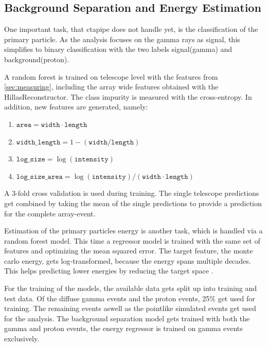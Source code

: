 \subsection{Background Separation and Energy Estimation}
One important task, that ctapipe does not handle yet, is the classification of
the primary particle. As the analysis focuses on the gamma rays as signal, 
this simplifies to binary classification with the two labels signal(gamma) and
background(proton).

A random forest is trained
on telescope level with the features from \ref{sec:measuring}, including
the array wide features obtained with the
HillasReconstructor.
The class impurity is measured with the cross-entropy.
In addition, new features are generated, namely:

\begin{enumerate}
    \item $\texttt{area} = \texttt{width} \cdot \texttt{length}$
    \item $\texttt{width\_length} = 1 - (\texttt{width}/\texttt{length})$
    \item $\texttt{log\_size} = \log{(\texttt{intensity})}$
    \item $\texttt{log\_size\_area} = \log{(\texttt{intensity})} / (\texttt{width} \cdot \texttt{length})$
\end{enumerate}

A 3-fold cross validation is used during training.
The single telescope predictions get combined by
taking the mean of the single
predictions to provide a prediction for the complete array-event.

Estimation of the primary particles energy is another task, which 
is handled via a random forest model. This time a
regressor model is trained with the same
set of features and optimizing the mean squared error.
The target feature, the monte carlo energy, gets log-transformed,
because the energy spans multiple decades. This helps
predicting lower energies by reducing the target space \cite{ba-lars}.

For the training of the models, the available data gets split up into training
and test data. Of the diffuse gamma events and the proton events, 25\% get
used for training. The remaining events aswell as the pointlike simulated events
get used for the analysis.
The background separation model gets trained with both the gamma
and proton events, the energy regressor is trained on gamma events
exclusively.

